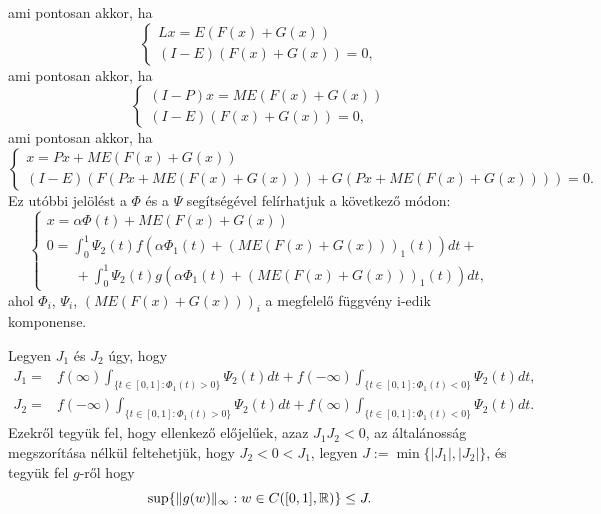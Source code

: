 \documentclass[oneside, titlepage, 12pt, a4paper]{report}
\DeclarePairedDelimiter\norm{\lVert}{\rVert}	%
\begin{document}
ami pontosan akkor, ha
\begin{equation*}
\begin{cases}
Lx = E(F(x) + G(x)) \\
(I - E)(F(x) + G(x)) = 0,
\end{cases}
\end{equation*}
ami pontosan akkor, ha
\begin{equation*}
\begin{cases}
(I - P)x = ME(F(x) + G(x)) \\
(I - E)(F(x) + G(x)) = 0,
\end{cases}
\end{equation*}
ami pontosan akkor, ha
\begin{equation*}
\begin{cases}
x = Px + ME(F(x) + G(x)) \\
(I - E)(F(Px + ME(F(x) + G(x))) + G(Px + ME(F(x) + G(x)))) = 0.
\end{cases}
\end{equation*}
Ez utóbbi jelölést a $\Phi$ és a $\Psi$ segítségével felírhatjuk a következő módon:
\begin{equation*}
\begin{cases}
x = \alpha \Phi(t) + ME(F(x) + G(x)) \\
0 = \int_0^1 \Psi_2(t) f(\alpha \Phi_1(t) + (ME(F(x) + G(x)))_1(t)) dt + \\
\qquad + \int_0^1 \Psi_2(t) g(\alpha \Phi_1(t) + (ME(F(x) + G(x)))_1(t)) dt,
\end{cases}
\end{equation*}
ahol $\Phi_i$, $\Psi_i$, $(ME(F(x) + G(x)))_i$ a megfelelő függvény i-edik komponense. \par
Legyen $J_1$ és $J_2$ úgy, hogy
\begin{align*}
J_1 =& f(\infty) \int_{ \{ t \in [0, 1] : \Phi_1(t) > 0 \} } \Psi_2(t) dt + f(-\infty) \int_{ \{ t \in [0, 1] : \Phi_1(t) < 0 \}} \Psi_2(t) dt, \\
J_2 =& f(-\infty) \int_{ \{ t \in [0, 1] : \Phi_1(t) > 0 \} } \Psi_2(t) dt + f(\infty) \int_{ \{ t \in [0, 1] : \Phi_1(t) < 0 \}} \Psi_2(t) dt.
\end{align*}
Ezekről tegyük fel, hogy ellenkező előjelűek, azaz $J_1 J_2 < 0$, az általánosság megszorítása nélkül feltehetjük, hogy $J_2 < 0 < J_1$, legyen $J := \min\{|J_1|, |J_2|\}$, és tegyük fel $g$-ről hogy
\begin{equation*}
\sup \{ \norm{g(w)}_\infty : w \in C([0, 1], \mathbb{R}) \} \le J.
\end{equation*}
\end{document}
